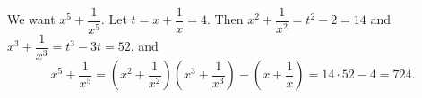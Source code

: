 We want $x^5+\dfrac{1}{x^5}$. Let $t=x+\dfrac{1}{x}=4$. Then $x^2+\dfrac{1}{x^2}=t^2-2=14$ and $x^3+\dfrac{1}{x^3}=t^3-3t=52$, and
\[x^5+\dfrac{1}{x^5}=\left(x^2+\dfrac{1}{x^2}\right)\left(x^3+\dfrac{1}{x^3}\right)-\left(x+\dfrac{1}{x}\right)=14\cdot52-4=\boxed{724}.\]
